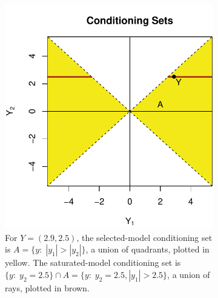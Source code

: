 \documentclass{article}
\theoremstyle{definition}
\begin{document}
\begin{figure}
  \centering
  \begin{subfigure}[t]{.4\textwidth}
    \includegraphics[width=\textwidth]{figs/fullvred.pdf}
    \caption{For $Y=(2.9,2.5)$, the selected-model conditioning set is
      $A=\{y:\;|y_1|>|y_2|\}$, a union of quadrants,
      plotted in yellow. The saturated-model conditioning set
      is ${\{y:\; y_2=2.5\}\cap A} = {\{y:\;y_2=2.5, |y_1|>2.5\}}$,
      a union of rays, plotted in brown.}
    \label{fig:fullvredSets}
  \end{subfigure}
  \hspace{.1\textwidth}
  \begin{subfigure}[t]{.4\textwidth}

\end{subfigure}
\end{figure}
\end{document}
